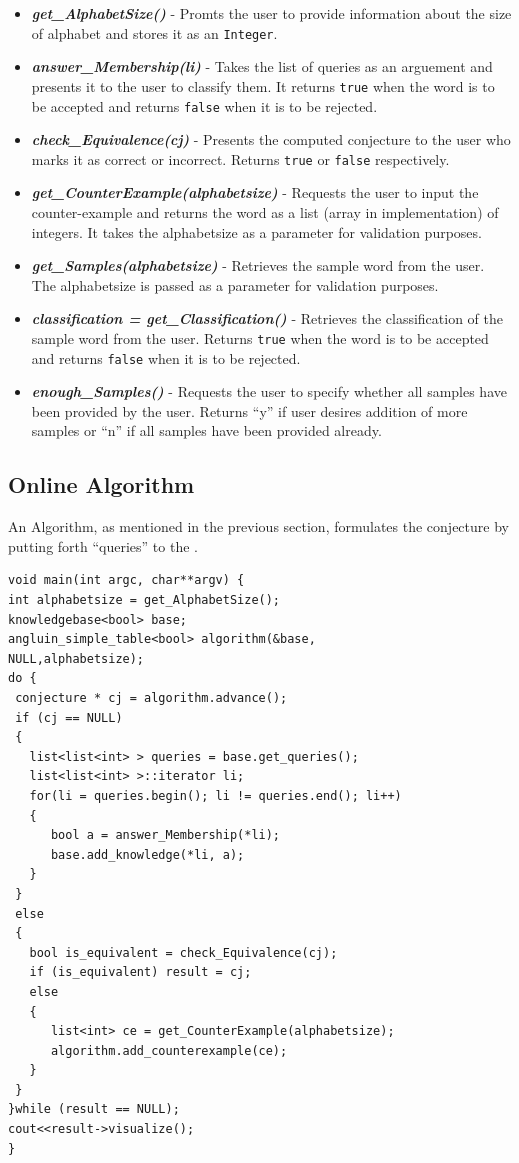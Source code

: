 \begin{itemize}
\item \textbf{\emph{get\_AlphabetSize()}} - Promts the user to provide information about the size of alphabet and stores it as an \texttt{Integer}.
\item \textbf{\emph{answer\_Membership(\*li)}} - Takes the list of queries as an arguement and presents it to the user to classify them. It returns \texttt{true} when the word is to be accepted and returns \texttt{false} when it is to be rejected.
\item \textbf{\emph{check\_Equivalence(cj)}} - Presents the computed conjecture to the user who marks it as correct or incorrect. Returns \texttt{true} or \texttt{false} respectively.
\item \textbf{\emph{get\_CounterExample(alphabetsize)}} - Requests the user to input the counter-example and returns the word as a list (array in \java implementation) of integers. It takes the alphabetsize as a parameter for validation purposes.
\item \textbf{\emph{get\_Samples(alphabetsize)}} - Retrieves the sample word from the user. The alphabetsize is passed as a parameter for validation purposes.
\item \textbf{\emph{classification = get\_Classification()}} - Retrieves the classification of the sample word from the user. Returns \texttt{true} when the word is to be accepted and returns \texttt{false} when it is to be rejected.
\item \textbf{\emph{enough\_Samples()}} - Requests the user to specify whether all samples have been provided by the user. Returns ``y'' if user desires addition of more samples or ``n'' if all samples have been provided already.
\end{itemize}

\subsection{Online Algorithm}

An \online Algorithm, as mentioned in the previous section, formulates the conjecture by putting forth ``queries'' to the \teacher.

\lstset{language=c++, numbers=left, numberstyle=\tiny, stepnumber=1, numbersep=5pt}
\begin{lstlisting}[frame=single]
void main(int argc, char**argv) {
int alphabetsize = get_AlphabetSize();
knowledgebase<bool> base;
angluin_simple_table<bool> algorithm(&base,
NULL,alphabetsize);
do {
 conjecture * cj = algorithm.advance();
 if (cj == NULL) 
 {
   list<list<int> > queries = base.get_queries();
   list<list<int> >::iterator li;
   for(li = queries.begin(); li != queries.end(); li++) 
   {
      bool a = answer_Membership(*li);
      base.add_knowledge(*li, a);
   }
 }
 else 
 {
   bool is_equivalent = check_Equivalence(cj);
   if (is_equivalent) result = cj; 
   else 
   {	
      list<int> ce = get_CounterExample(alphabetsize);
      algorithm.add_counterexample(ce);
   }
 }
}while (result == NULL);
cout<<result->visualize();
}
\end{lstlisting}

